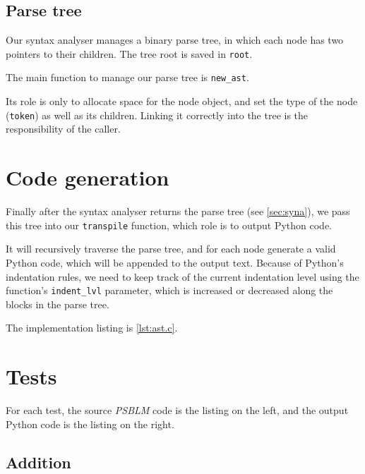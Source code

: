 \documentclass[a4paper,12pt,notitlepage,english]{article}
\begin{document}
  \subsection{Parse tree}

  Our syntax analyser manages a binary parse tree, in which each node has two pointers to their children.
  The tree root is saved in \texttt{root}.

  The main function to manage our parse tree is \texttt{new\_ast}.

  \noindent\begin{minipage}{.3\linewidth}
    Its role is only to allocate space for the node object, and set the type of the node (\texttt{token}) as well as its children.
    Linking it correctly into the tree is the responsibility of the caller.
  \end{minipage}\hspace{.05\linewidth}\begin{minipage}{.65\linewidth}
    
  \end{minipage}

  \section{Code generation}

  Finally after the syntax analyser returns the parse tree (see \autoref{sec:syna}), we pass this tree into our \texttt{transpile} function, which role is to output Python code.

  It will recursively traverse the parse tree, and for each node generate a valid Python code, which will be appended to the output text.
  Because of Python's indentation rules, we need to keep track of the current indentation level using the function's \texttt{indent\_lvl} parameter, which is increased or decreased along the blocks in the parse tree.

  The implementation listing is \autoref{lst:ast.c}.

  \section{Tests}

  For each test, the source \emph{PSBLM} code is the listing on the left, and the output Python code is the listing on the right.

  \subsection{Addition}
\end{document}
